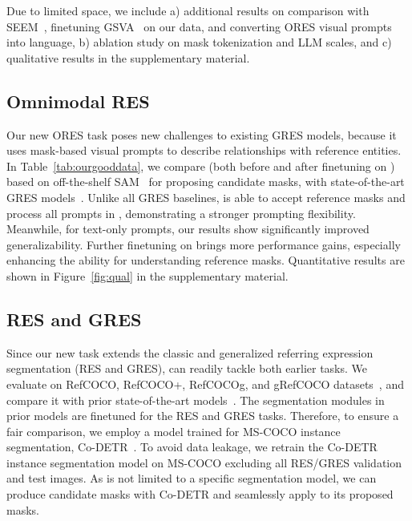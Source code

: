 Due to limited space, we include a) additional results on comparison with SEEM~\cite{zou2024segment}, finetuning GSVA~\cite{xia2024gsva} on our data, and converting ORES visual prompts into language, b) ablation study on mask tokenization and LLM scales, and c) qualitative results in the supplementary material.

\subsection{Omnimodal RES}
\label{sec:expr-ours}
Our new ORES task poses new challenges to existing GRES models, because it uses mask-based visual prompts to describe relationships with reference entities. In Table~\ref{tab:ourgooddata}, we compare \ourmodel (both before and after finetuning on \ourgooddata) based on off-the-shelf SAM~\cite{kirillov2023segment} for proposing candidate masks, with state-of-the-art GRES models~\cite{liu2023gres, zhang2024psalm, xia2024gsva}. Unlike all GRES baselines, \ourmodel is able to accept reference masks and process all prompts in \ourgooddata, demonstrating a stronger prompting flexibility. Meanwhile, for text-only prompts, our results show significantly improved generalizability. Further finetuning \ourmodel on \ourgooddata brings more performance gains, especially enhancing the ability for understanding reference masks. Quantitative results are shown in Figure~\ref{fig:qual} in the supplementary material.

\subsection{RES and GRES}
\label{sec:expr-res}
Since our new task extends the classic and generalized referring expression segmentation (RES and GRES), \ourmodel can readily tackle both earlier tasks. We evaluate \ourmodel on RefCOCO, RefCOCO+, RefCOCOg, and gRefCOCO datasets~\cite{yu2016modeling, liu2023gres}, and compare it with prior state-of-the-art models~\cite{lai2024lisa, chng2024mask, zhang2024groundhog, rasheed2024glamm, xu2024ullava, chen2024sam4mllm, zhang2024psalm, yang2022lavt, luo2024hdc, liu2023gres, yan2023universal}. The segmentation modules in prior models are finetuned for the RES and GRES tasks. Therefore, to ensure a fair comparison, we employ a model trained for MS-COCO instance segmentation, Co-DETR~\cite{zong2023detrs}. To avoid data leakage, we retrain the Co-DETR instance segmentation model on MS-COCO excluding all RES/GRES validation and test images. As \ourmodel is not limited to a specific segmentation model, we can produce candidate masks with Co-DETR and seamlessly apply \ourmodel to its proposed masks.

